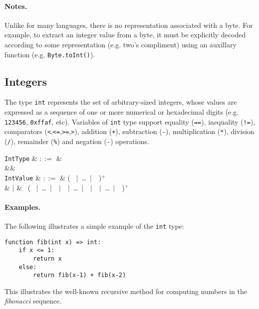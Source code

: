 \paragraph{Notes.}  Unlike for many languages, there is no
representation associated with a byte. For example, to extract an
integer value from a byte, it must be explicitly decoded according to
some representation (e.g. two's compliment) using an auxillary function (e.g. \lstinline{Byte.toInt()}).



\subsection{Integers}

The type \lstinline{int} represents the set of arbitrary-sized integers, whose values are expressed as a sequence of one or more numerical or hexadecimal digits (e.g. \lstinline{123456}, \lstinline{0xffaf}, etc).  Variables of \lstinline{int} type support equality (\lstinline{==}), inequality (\lstinline{!=}), comparators (\lstinline{<},\lstinline{<=},\lstinline{>=},\lstinline{>}), addition (\lstinline{+}), subtraction (\lstinline{-}), multiplication (\lstinline{*}), division (\lstinline{/}), remainder (\lstinline{%}) and negation (\lstinline{-}) operations.


\begin{syntax}
  \verb+IntType+ & $::=$ &  \\
  &&\\
  \verb+IntValue+ & $::=$ & \big( \ $|$\ \ldots\ $|$\ \ \big)$^+$ \\
  & $|$ &  \ \big( \ $|$\ \ldots\ $|$\ \ $|$\ \ $|$\ \ldots\ $|$\ \ $|$\ \ $|$\ \ldots\ $|$\ \ \big)$^+$\\
\end{syntax}

\paragraph{Examples.}  The following illustrates a simple example of the \lstinline{int} type:

\begin{lstlisting}
function fib(int x) => int:
    if x <= 1:
        return x
    else:
        return fib(x-1) + fib(x-2)
\end{lstlisting}
This illustrates the well-known recursive method for computing numbers in the {\em fibonacci} sequence.

